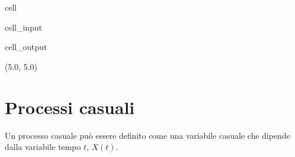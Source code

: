 \documentclass[letterpaper,10pt,italian]{jupyterBook}
\begin{document}
\begin{sphinxuseclass}{cell}
\begin{sphinxVerbatimInput}
\begin{sphinxuseclass}{cell_input}
\begin{sphinxVerbatim}[commandchars=\\\{\}]
      
\end{sphinxVerbatim}

\end{sphinxuseclass}\end{sphinxVerbatimInput}
\begin{sphinxVerbatimOutput}

\begin{sphinxuseclass}{cell_output}
\begin{sphinxVerbatim}[commandchars=\\\{\}]
(\PYGZhy{}5.0, 5.0)
\end{sphinxVerbatim}

\noindent{}

\end{sphinxuseclass}\end{sphinxVerbatimOutput}

\end{sphinxuseclass}
\sphinxstepscope


\section{Processi casuali}
\label{\detokenize{ch/statistics/random_processes:processi-casuali}}\label{\detokenize{ch/statistics/random_processes:statistics-hs-random-processes}}\label{\detokenize{ch/statistics/random_processes::doc}}
\sphinxAtStartPar
Un processo casuale può essere definito come una variabile casuale che dipende dalla variabile tempo \(t\), \(X(t)\).

\sphinxAtStartPar
{} 
\end{document}
